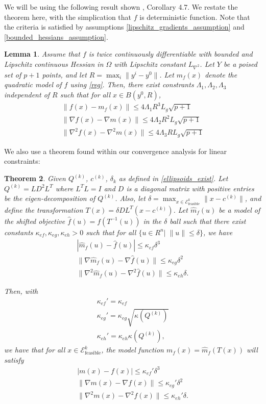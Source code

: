 \documentclass{article}
\newtheorem{theorem}{Theorem}[section]
\newtheorem{lemma}[theorem]{Lemma}
\theoremstyle{case}
\newcommand{\ck}{{c^{(k)}}}
\newcommand{\gradf}{\nabla f}
\newcommand{\liphess}{{L_{\nabla^2}}}
\newcommand{\qk}{{Q^{(k)}}}
\newcommand{\sdk}{{\delta_k}}
\newcommand{\unshiftedellipsoid}{{\mathcal E^k_{\text{feasible}}}}
\begin{document}
We will be using the following result shown \cite{Billups_Larson_2013}, Corollary 4.7.
We restate the theorem here, with the simplication that $f$ is deterministic function.
Note that the criteria is satisfied by assumptions \cref{lipschitz_gradients_assumption} and \cref{bounded_hessians_assumption}.

\begin{lemma}
\label{change_radius} 
Assume that $f$ is twice continuously differentiable with bounded and Lipschitz continuous Hessian in $\Omega$ with Lipschitz constant $\liphess$.
Let $Y$ be a poised set of $p + 1$ points, and let $R = \max_{i}\|y^i - y^0\|$.
Let $m_f(x)$ denote the quadratic model of $f$ using \cref{reg}.
Then, there exist constrants $\Lambda_1, \Lambda_2, \Lambda_3$ independent of $R$ such that for all $x \in B(y^0, R)$,
\begin{align*}
\|f(x) - m_f(x)\| \le 4\Lambda_1 R^3L_g \sqrt{p+1} \\
\|\gradf(x) - \nabla m(x)\| \le 4\Lambda_2R^2  L_g \sqrt{p+1} \\
\|\nabla^2 f(x) - \nabla^2 m(x)\| \le 4\Lambda_3  RL_g \sqrt{p+1}
\end{align*}
\end{lemma}


We also use a theorem found within our convergence analysis for linear constraints:
\begin{theorem}
\label{shifted_ellipsoid}
Given $\qk$, $\ck$, $\sdk$ as defined in \cref{ellipsoids_exist}.
Let $\qk = L D^2 L^T$ where $L^TL = I$ and $D$ is a diagonal matrix with positive entries be the eigen-decomposition of $\qk$.
Also, let $\delta = \max_{x\in \unshiftedellipsoid}\|x-\ck\|$, 
and define the transformation $T(x) = \delta DL^T(x - \ck)$.
Let $\hat m_f(u)$ be a model of the shifted objective $\hat f(u) = f(T^{-1}(u))$ in the $\delta$ ball such that
there exist constants $\kappa_{ef}, \kappa_{eg}, \kappa_{eh} > 0$ such that for all $\{u \in R^n | \;\|u\| \le \delta \}$, we have
\begin{align*}
|\hat m_f(u) - \hat f(u)| \le \kappa_{ef} \delta^3\\
\|\nabla \hat m_f(u) - \nabla \hat f(u)\| \le \kappa_{eg}\delta^2\\
\|\nabla^2 \hat m_f(u) - \nabla^2 \hat f(u)\| \le \kappa_{eh}\delta.
\end{align*}

Then, with
\begin{align*}
\kappa_{ef}' = \kappa_{ef} \\
\kappa_{eg}' = \kappa_{eg}\sqrt{\kappa(\qk)} \\
\kappa_{eh}' = \kappa_{eh}\kappa(\qk),
\end{align*}
we have that for all $x \in \unshiftedellipsoid$,
the model function $m_f(x) = \hat m_f(T(x))$ will satisfy
\begin{align*}
| m(x) - f(x)| \le \kappa_{ef}'\delta^3 \\
\|\nabla  m(x) - \nabla  f(x)\| \le \kappa_{eg}'\delta^2 \\
\|\nabla^2 m(x) - \nabla^2 f(x)\| \le \kappa_{eh}'\delta.
\end{align*}
\end{theorem}
\end{document}
